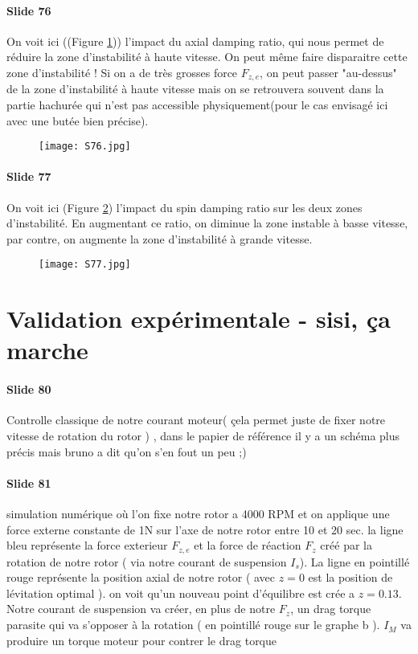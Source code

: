 \paragraph{Slide 76} On voit ici ((Figure \ref{fig:S76})) l'impact du axial damping ratio, qui nous permet de réduire la zone d'instabilité à haute vitesse. On peut même faire disparaitre cette zone d'instabilité ! Si on a de très grosses force $F_{z,e}$, on peut passer "au-dessus" de la zone d'instabilité à haute vitesse mais on se retrouvera souvent dans la partie hachurée qui n'est pas accessible physiquement(pour le cas envisagé ici avec une butée bien précise).
\begin{figure}[H]
    \centering
    \texttt{[image: S76.jpg]}
    \caption{}
    \label{fig:S76}
\end{figure}
\paragraph{Slide 77} On voit ici (Figure \ref{fig:S77}) l'impact du spin damping ratio sur les deux zones d'instabilité. En augmentant ce ratio, on diminue la zone instable à basse vitesse, par contre, on augmente la zone d'instabilité à grande vitesse.
\begin{figure}[H]
    \centering
    \texttt{[image: S77.jpg]}
    \caption{}
    \label{fig:S77}
\end{figure}





\section{Validation expérimentale - sisi, ça marche}

\paragraph{Slide 80} Controlle classique de notre courant moteur( çela permet juste de fixer notre vitesse de rotation du rotor )   , dans le papier de référence il y a un schéma plus précis mais bruno a dit qu'on s'en fout un peu ;) 

\paragraph{Slide 81} simulation numérique où l'on fixe notre rotor a 4000 RPM et on applique une force externe constante de 1N sur l'axe de notre rotor entre 10 et 20 sec. la ligne bleu représente la force exterieur $F_{z,e}$ et la force de réaction $F_z$ créé par la rotation de notre rotor ( via notre courant de suspension $I_s$). La ligne en pointillé rouge représente la position axial de notre rotor ( avec $z=0$ est la position de lévitation optimal ). on voit qu'un nouveau point d'équilibre est crée a $z=0.13$. Notre courant de suspension va créer, en plus de notre $F_z$, un drag torque parasite qui va s'opposer à la rotation ( en pointillé rouge sur le graphe b ). $I_M$ va produire un torque moteur pour contrer le drag torque

